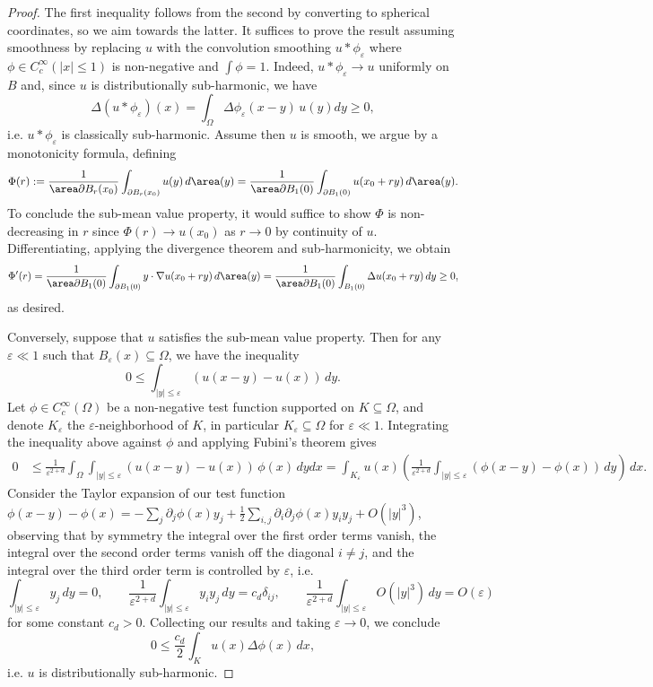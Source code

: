 \documentclass[reqno]{amsart}
\theoremstyle{definition}
\theoremstyle{remark}
\renewcommand{\epsilon}{\varepsilon}
\begin{document}
\begin{proof}
	The first inequality follows from the second by converting to spherical coordinates, so we aim towards the latter. It suffices to prove the result assuming smoothness by replacing $u$ with the convolution smoothing $u * \phi_\epsilon$ where $\phi \in C^\infty_c (|x| \leq 1)$ is non-negative and $\int \phi = 1$. Indeed, $u * \phi_\epsilon \to u$ uniformly on $B$ and, since $u$ is distributionally sub-harmonic, we have
		\[ \Delta (u * \phi_\epsilon) (x) = \int_\Omega \Delta \phi_\epsilon (x - y)\, u(y) dy \geq 0, \]
	i.e. $u * \phi_\epsilon$ is classically sub-harmonic. Assume then $u$ is smooth, we argue by a monotonicity formula, defining 
		\[ \Phi (r) := \frac{1}{\area \partial B_r (x_0)} \int_{\partial B_r (x_0)} u(y) \, d \area (y) = \frac{1}{\area \partial B_1 (0)} \int_{\partial B_1 (0)} u(x_0 + ry) \, d \area (y).  \]
	To conclude the sub-mean value property, it would suffice to show $\Phi$ is non-decreasing in $r$ since $\Phi(r) \to u(x_0)$ as $r \to 0$ by continuity of $u$. Differentiating, applying the divergence theorem and sub-harmonicity, we obtain
		\[ \Phi' (r) =  \frac{1}{\area \partial B_1 (0)} \int_{\partial B_1 (0)} y \cdot \nabla u(x_0 + ry) \, d \area (y) = \frac{1}{\area \partial B_1 (0)} \int_{B_1 (0)} \Delta u(x_0 + ry) \, dy \geq 0, \]
	as desired. 
	
	Conversely, suppose that $u$ satisfies the sub-mean value property. Then for any $\epsilon \ll 1$ such that $B_\epsilon (x) \subseteq \Omega$, we have the inequality
		\[ 0 \leq \int_{|y| \leq \epsilon} (u(x - y) - u(x)) \, dy. \]
	Let $\phi \in C^\infty_c (\Omega)$ be a non-negative test function supported on $K \subseteq \Omega$, and denote $K_\epsilon$ the $\epsilon$-neighborhood of $K$, in particular $K_\epsilon \subseteq \Omega$ for $\epsilon \ll 1$. Integrating the inequality above against $\phi$ and applying Fubini's theorem gives
		\begin{align*}
			0 
				&\leq \frac{1}{\epsilon^{2 + d}} \int_\Omega \int_{|y| \leq \epsilon} (u(x - y) - u(x)) \, \phi(x) \, dy dx = \int_{K_\epsilon} u(x) \left( \frac{1}{\epsilon^{2 + d}} \int_{|y| \leq \epsilon} (\phi(x - y) - \phi(x)) \, dy \right) \, dx.
		\end{align*}
	Consider the Taylor expansion of our test function $\phi(x - y) - \phi(x) = - \sum_j\partial_j \phi(x) y_j	 + \tfrac12 \sum_{i,j} \partial_i \partial_j \phi(x) y_i y_j + O(|y|^3)$, observing that by symmetry the integral over the first order terms vanish, the integral over the second order terms vanish off the diagonal $i \neq j$, and the integral over the third order term is controlled by $\epsilon$, i.e.
		\[ \int_{|y| \leq \epsilon} y_j  \, dy = 0, \qquad  \frac{1}{\epsilon^{2 + d}} \int_{|y| \leq \epsilon}  y_i y_j \, dy = c_d \delta_{ij}, \qquad \frac{1}{\epsilon^{2 + d}} \int_{|y| \leq \epsilon} O(|y|^3) \, dy = O(\epsilon) \]
	for some constant $c_d > 0$. Collecting our results and taking $\epsilon \to 0$, we conclude
		\[ 0 \leq \frac{c_d}{2} \int_K u(x) \Delta\phi (x) \, dx, \]
	i.e. $u$ is distributionally sub-harmonic.  	
\end{proof}
\end{document}
